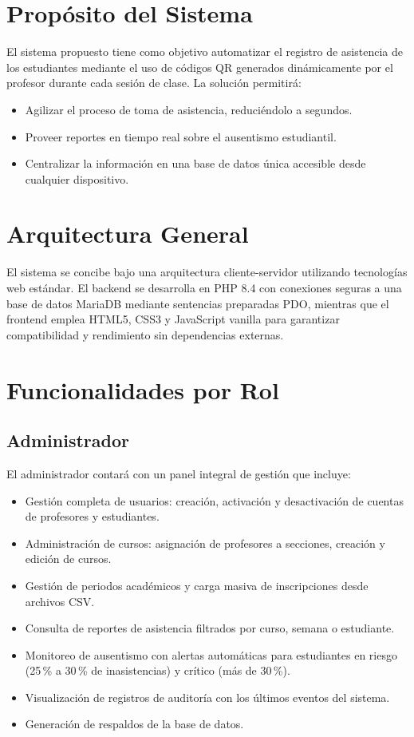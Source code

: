 \documentclass[12pt, letterpaper, oneside]{report}
\begin{document}
\section{Prop\'osito del Sistema}

El sistema propuesto tiene como objetivo automatizar el registro de asistencia de los estudiantes mediante el uso de c\'odigos QR generados din\'amicamente por el profesor durante cada sesi\'on de clase. La soluci\'on permitir\'a:

\begin{itemize}
  \item Agilizar el proceso de toma de asistencia, reduci\'endolo a segundos.
  \item Proveer reportes en tiempo real sobre el ausentismo estudiantil.
  \item Centralizar la informaci\'on en una base de datos \'unica accesible desde cualquier dispositivo.
\end{itemize}

\section{Arquitectura General}

El sistema se concibe bajo una arquitectura cliente-servidor utilizando tecnolog\'ias web est\'andar. El backend se desarrolla en PHP 8.4 con conexiones seguras a una base de datos MariaDB mediante sentencias preparadas PDO, mientras que el frontend emplea HTML5, CSS3 y JavaScript vanilla para garantizar compatibilidad y rendimiento sin dependencias externas.

\section{Funcionalidades por Rol}

\subsection{Administrador}

El administrador contar\'a con un panel integral de gesti\'on que incluye:

\begin{itemize}
  \item Gesti\'on completa de usuarios: creaci\'on, activaci\'on y desactivaci\'on de cuentas de profesores y estudiantes.
  \item Administraci\'on de cursos: asignaci\'on de profesores a secciones, creaci\'on y edici\'on de cursos.
  \item Gesti\'on de periodos acad\'emicos y carga masiva de inscripciones desde archivos CSV.
  \item Consulta de reportes de asistencia filtrados por curso, semana o estudiante.
  \item Monitoreo de ausentismo con alertas autom\'aticas para estudiantes en riesgo (25\,\% a 30\,\% de inasistencias) y cr\'itico (m\'as de 30\,\%).
  \item Visualizaci\'on de registros de auditor\'ia con los \'ultimos eventos del sistema.
  \item Generaci\'on de respaldos de la base de datos.
\end{itemize}
\end{document}

